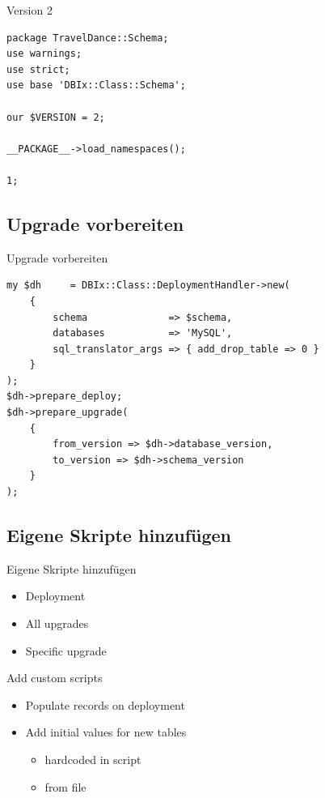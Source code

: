 \begin{frame}[fragile]{Version 2}
\begin{lstlisting}
package TravelDance::Schema;
use warnings;
use strict;
use base 'DBIx::Class::Schema';

our $VERSION = 2;

__PACKAGE__->load_namespaces();

1;
\end{lstlisting}
\end{frame}

\subsection{Upgrade vorbereiten}

\begin{frame}[fragile]{Upgrade vorbereiten}
\begin{lstlisting}
my $dh     = DBIx::Class::DeploymentHandler->new(
    {
        schema              => $schema,
        databases           => 'MySQL',
        sql_translator_args => { add_drop_table => 0 }
    }
);
$dh->prepare_deploy;
$dh->prepare_upgrade(
    {
        from_version => $dh->database_version,
        to_version => $dh->schema_version
    }
);
\end{lstlisting}
\end{frame}

\subsection{Eigene Skripte hinzufügen}

\begin{frame}{Eigene Skripte hinzufügen}
\begin{itemize}
\item Deployment
\item All upgrades
\item Specific upgrade
\end{itemize}
\end{frame}

\begin{frame}{Add custom scripts}
\begin{itemize}
\item Populate records on deployment
\item Add initial values for new tables
\begin{itemize}
\item hardcoded in script
\item from file
\end{itemize}
\end{itemize}
\end{frame}

